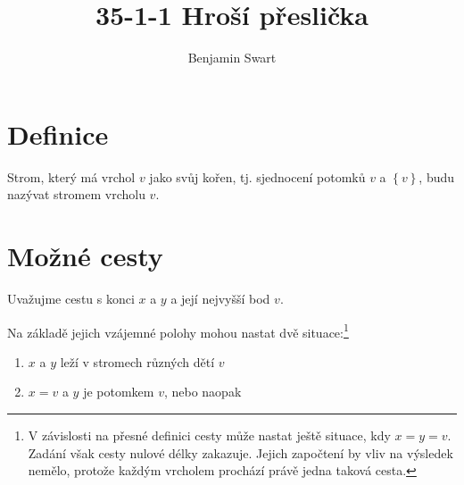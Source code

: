 \documentclass{article}
\title{35-1-1 Hroší přeslička}
\author{Benjamin Swart}
\begin{document}
\maketitle

\section{Definice}

Strom, který má vrchol $v$ jako svůj kořen, tj. sjednocení potomků $v$ a $\left\{v\right\}$, budu nazývat stromem vrcholu $v$.

\section{Možné cesty}

Uvažujme cestu s konci $x$ a $y$ a její nejvyšší bod $v$.

Na základě jejich vzájemné polohy mohou nastat dvě situace:\footnote{V závislosti na přesné definici cesty může nastat ještě situace, kdy $x = y = v$. Zadání však cesty nulové délky zakazuje. Jejich započtení by vliv na výsledek nemělo, protože každým vrcholem prochází právě jedna taková cesta.}

\begin{enumerate}
    \item $x$ a $y$ leží v stromech různých dětí $v$
    \item $x = v$ a $y$ je potomkem $v$, nebo naopak
\end{enumerate}
\end{document}
